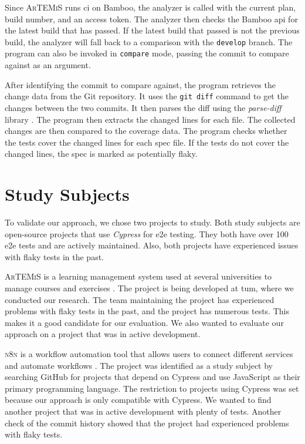 Since \textsc{ArTEMiS} runs \ac{ci} on Bamboo, the analyzer is called with the current plan, build number, and an access token.
The analyzer then checks the Bamboo \ac{api} for the latest build that has passed.
If the latest build that passed is not the previous build, the analyzer will fall back to a comparison with the \texttt{develop} branch.
The program can also be invoked in \texttt{compare} mode, passing the commit to compare against as an argument.

After identifying the commit to compare against, the program retrieves the change data from the Git repository.
It uses the \texttt{git diff} command to get the changes between the two commits.
It then parses the diff using the \textit{parse-diff} library \autocite{todyshev_parse-diff_2023}.
The program then extracts the changed lines for each file.
The collected changes are then compared to the coverage data.
The program checks whether the tests cover the changed lines for each spec file.
If the tests do not cover the changed lines, the spec is marked as potentially flaky.

\section{Study Subjects}
To validate our approach, we chose two projects to study.
Both study subjects are open-source projects that use \textit{Cypress} for \ac{e2e} testing.
They both have over 100 \ac{e2e} tests and are actively maintained.
Also, both projects have experienced issues with flaky tests in the past.

\textsc{ArTEMiS} is a learning management system used at several universities to manage courses and exercises \autocite{krusche_artemis_2018}.
The project is being developed at \ac{tum}, where we conducted our research.
The team maintaining the project has experienced problems with flaky tests in the past, and the project has numerous tests.
This makes it a good candidate for our evaluation.
We also wanted to evaluate our approach on a project that was in active development.

\textsc{n8n} is a workflow automation tool that allows users to connect different services and automate workflows \autocite{noauthor_n8n_2023}.
The project was identified as a study subject by searching GitHub for projects that depend on Cypress and use JavaScript as their primary programming language.
The restriction to projects using Cypress was set because our approach is only compatible with Cypress.
We wanted to find another project that was in active development with plenty of tests.
Another check of the commit history showed that the project had experienced problems with flaky tests.

